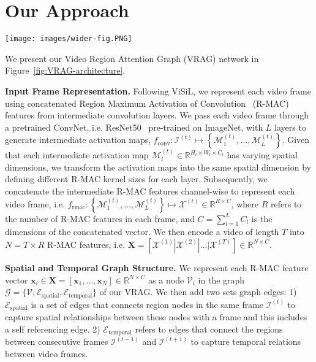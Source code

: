 \documentclass[letterpaper]{article} \usepackage{aaai22}  \usepackage{times}  \usepackage{helvet}  \usepackage{courier}  \usepackage[hyphens]{url}  \usepackage{graphicx} \urlstyle{rm} \usepackage{amsmath}
\begin{document}
\section{Our Approach}
\begin{figure*}[t]
    \centering
    \texttt{[image: images/wider-fig.PNG]}
    \caption{Our Video Region Attention Graph Network (VRAG). (Left) Graph structure. (Right) VRAG Network.}
    \label{fig:VRAG-architecture}
\end{figure*}

We present our Video Region Attention Graph (VRAG) network in Figure~\ref{fig:VRAG-architecture}. 

\textbf{\label{sect:frame-repr}Input Frame Representation.} Following ViSiL, we represent each video frame using concatenated Region Maximum Activation of Convolution~\cite{rmac} (R-MAC) features from intermediate convolution layers. We pass each video frame through a pretrained ConvNet, i.e. ResNet50~\cite{resnet} pre-trained on ImageNet, with $L$ layers to generate intermediate activation maps, $f_\text{conv}: \mathcal{I}^{(t)} \mapsto \left\{\mathcal{M}^{(t)}_1, \ldots, \mathcal{M}^{(t)}_L\right\}$. Given that each intermediate activation map $\mathcal{M}_l^{(t)} \in \mathbb{R}^{H_l \times W_l \times C_l}$ has varying spatial dimensions, we transform the activation maps into the same spatial dimension by defining different R-MAC kernel sizes for each layer. Subsequently, we concatenate the intermediate R-MAC features channel-wise to represent each video frame, i.e. $f_\text{rmac}: \left\{\mathcal{M}^{(t)}_1, \ldots, \mathcal{M}^{(t)}_L\right\} \mapsto \mathcal{X}^{(t)} \in \mathbb{R}^{R \times C}$, where $R$ refers to the number of R-MAC features in each frame, and 
$C=\sum_{l=1}^{L}C_l$ is the dimensions of the concatenated vector. We then encode a video of length $T$ into $N=T\times R$ R-MAC features, i.e. $\mathbf{X} = \left[\mathcal{X}^{(1)}|\mathcal{X}^{(2)}| \ldots| \mathcal{X}^{(T)}\right] \in \mathbb{R}^{N \times C}$.

\textbf{Spatial and Temporal Graph Structure.}
We represent each R-MAC feature vector $\mathbf{x}_i \in \mathbf{X}=\left[\mathbf{x}_1, \ldots, \mathbf{x}_N\right] \in \mathbb{R}^{N \times C}$ as a node $\mathcal{V}_i$ in the graph $\mathcal{G} = \{\mathcal{V}, \mathcal{E}_\text{spatial}, \mathcal{E}_\text{temporal}\}$ of our VRAG.
We then add two sets graph edges: 1) $\mathcal{E}_\text{spatial}$ is a set of edges that connects region nodes in the same frame $\mathcal{I}^{(t)}$ to capture spatial relationships between these nodes with a frame and this includes a self referencing edge. 2) $\mathcal{E}_\text{temporal}$ refers to edges that connect the regions between consecutive frames $\mathcal{I}^{(t-1)}$ and $\mathcal{I}^{(t+1)}$ to capture temporal relations between video frames. 
\end{document}
